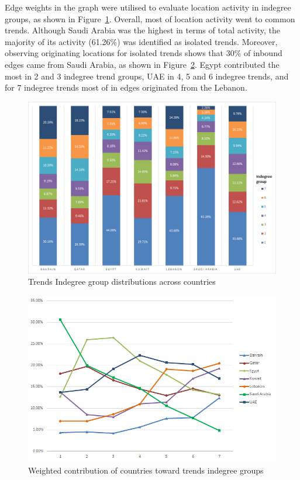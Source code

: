 \documentclass{llncs}
\begin{document}
Edge weights in the graph were utilised to evaluate location activity
in indegree groups, as shown in
Figure~\ref{fig:indegreegrouptrends}. Overall, most of location
activity went to common trends. Although Saudi Arabia was the highest
in terms of total activity, the majority of its activity (61.26\%) was
identified as isolated trends. Moreover, observing originating
locations for isolated trends shows that 30\% of inbound edges came
from Saudi Arabia, as shown in
Figure~\ref{fig:weightedcontributions}. Egypt contributed the most in
2 and 3 indegree trend groups, UAE in 4, 5 and 6 indegree trends, and
for 7 indegree trends most of in edges originated from the Lebanon.

\begin{figure}[htb]
\centering
\includegraphics[width=\columnwidth]{images/indegreegrouptrends.png}
\caption{Trends Indegree group distributions across countries}
\label{fig:indegreegrouptrends}
\end{figure}

\begin{figure}[htb]
\centering
\includegraphics[width=\columnwidth]{images/weightedcontributions.png}
\caption{Weighted contribution of countries toward trends indegree groups}
\label{fig:weightedcontributions}
\end{figure}
\end{document}

